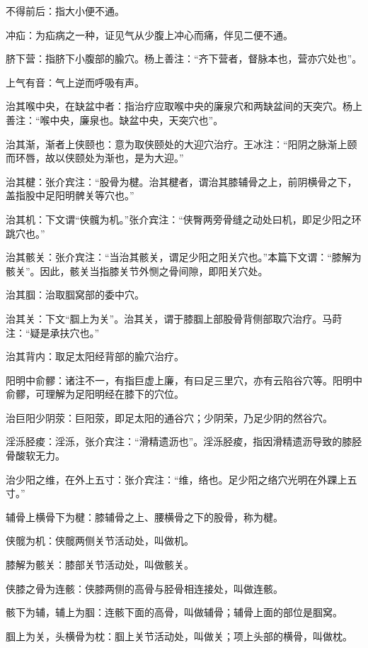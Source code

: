 \documentclass[12pt]{ctexbook}%
\begin{document}
\begin{jiaozhu}
  \item 不得前后：指大小便不通。
  \item 冲疝：为疝病之一种，证见气从少腹上冲心而痛，伴见二便不通。
  \item 脐下营：指脐下小腹部的腧穴。杨上善注：“齐下营者，督脉本也，营亦穴处也”。
  \item 上气有音：气上逆而呼吸有声。
  \item 治其喉中央，在缺盆中者：指治疗应取喉中央的廉泉穴和两缺盆间的天突穴。杨上善注：“喉中央，廉泉也。缺盆中央，天突穴也”。
  \item 治其渐，渐者上侠颐也：意为取侠颐处的大迎穴治疗。王冰注：“阳阴之脉渐上颐而环唇，故以侠颐处为渐也，是为大迎。”
  \item 治其楗：张介宾注：“股骨为楗。治其楗者，谓治其膝辅骨之上，前阴横骨之下，盖指股中足阳明髀关等穴也。”
  \item 治其机：下文谓“侠髖为机。”张介宾注：“侠臀两旁骨缝之动处曰机，即足少阳之环跳穴也。”
  \item 治其骸关：张介宾注：“当治其骸关，谓足少阳之阳关穴也。”本篇下文谓：“膝解为骸关”。因此，骸关当指膝关节外恻之骨间隙，即阳关穴处。
  \item 治其腘：治取腘窝部的委中穴。
  \item 治其关：下文“腘上为关”。治其关，谓于膝腘上部股骨背侧部取穴治疗。马莳注：“疑是承扶穴也。”
  \item 治其背内：取足太阳经背部的腧穴治疗。
  \item 阳明中俞髎：诸注不一，有指巨虚上廉，有曰足三里穴，亦有云陷谷穴等。阳明中俞髎，可理解为足阳明经在膝下的穴位。
  \item 治巨阳少阴荥：巨阳荥，即足太阳的通谷穴；少阴荣，乃足少阴的然谷穴。
  \item 淫泺胫痠：淫泺，张介宾注：“滑精遗沥也”。淫泺胫痠，指因滑精遗沥导致的膝胫骨酸软无力。
  \item 治少阳之维，在外上五寸：张介宾注：“维，络也。足少阳之络穴光明在外踝上五寸。”
  \item 辅骨上横骨下为楗：膝辅骨之上、腰横骨之下的股骨，称为楗。
  \item 侠髋为机：侠髋两侧关节活动处，叫做机。
  \item 膝解为骸关：膝部关节活动处，叫做骸关。
  \item 侠膝之骨为连骸：侠膝两侧的高骨与胫骨相连接处，叫做连骸。
  \item 骸下为辅，辅上为腘：连骸下面的高骨，叫做辅骨；辅骨上面的部位是腘窝。
  \item 腘上为关，头横骨为枕：腘上关节活动处，叫做关；项上头部的横骨，叫做枕。
\end{jiaozhu}
\end{document}
